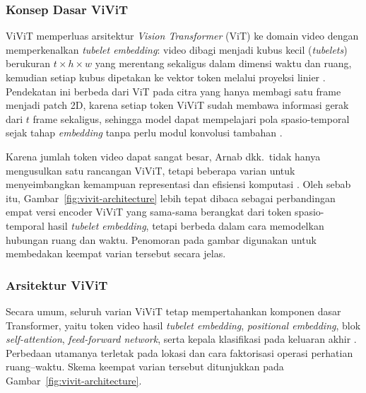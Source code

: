 \subsubsection{Konsep Dasar ViViT} \label{II.ViViT.1}
ViViT memperluas arsitektur \textit{Vision Transformer} (ViT) \cite{Dosovitskiy2021} ke domain video dengan memperkenalkan \textit{tubelet embedding}: video dibagi menjadi kubus kecil (\textit{tubelets}) berukuran $t \times h \times w$ yang merentang sekaligus dalam dimensi waktu dan ruang, kemudian setiap kubus dipetakan ke vektor token melalui proyeksi linier \cite{Arnab2021}. Pendekatan ini berbeda dari ViT pada citra yang hanya membagi satu frame menjadi patch 2D, karena setiap token ViViT sudah membawa informasi gerak dari $t$ frame sekaligus, sehingga model dapat mempelajari pola spasio-temporal sejak tahap \textit{embedding} tanpa perlu modul konvolusi tambahan \cite{Arnab2021}.\par

Karena jumlah token video dapat sangat besar, Arnab dkk.\ tidak hanya mengusulkan satu rancangan ViViT, tetapi beberapa varian untuk menyeimbangkan kemampuan representasi dan efisiensi komputasi \cite{Arnab2021}. Oleh sebab itu, Gambar~\ref{fig:vivit-architecture} lebih tepat dibaca sebagai perbandingan empat versi encoder ViViT yang sama-sama berangkat dari token spasio-temporal hasil \textit{tubelet embedding}, tetapi berbeda dalam cara memodelkan hubungan ruang dan waktu. Penomoran pada gambar digunakan untuk membedakan keempat varian tersebut secara jelas.\par

\subsubsection{Arsitektur ViViT} \label{II.ViViT.2}
Secara umum, seluruh varian ViViT tetap mempertahankan komponen dasar Transformer, yaitu token video hasil \textit{tubelet embedding}, \textit{positional embedding}, blok \textit{self-attention}, \textit{feed-forward network}, serta kepala klasifikasi pada keluaran akhir \cite{Vaswani2023,Arnab2021}. Perbedaan utamanya terletak pada lokasi dan cara faktorisasi operasi perhatian ruang--waktu. Skema keempat varian tersebut ditunjukkan pada Gambar~\ref{fig:vivit-architecture}.\par


